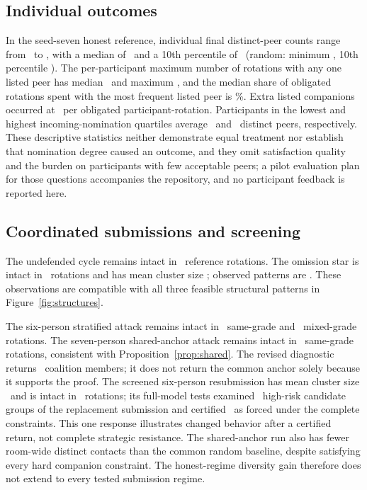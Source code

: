 \documentclass[11pt,a4paper]{article}
\theoremstyle{definition}\newtheorem{definition}[theorem]{Definition}
\theoremstyle{remark}\newtheorem{remark}[theorem]{Remark}
\begin{document}
\subsection{Individual outcomes}
In the seed-seven honest reference, individual final distinct-peer counts range from \FairMin\ to \FairMax, with a median of \PeersMedian\ and a 10th percentile of \PeersPTen\ (random: minimum \PeersMinRandom, 10th percentile \PeersPTenRandom). The per-participant maximum number of rotations with any one listed peer has median \RepeatSameMedian\ and maximum \RepeatSameMax, and the median share of obligated rotations spent with the most frequent listed peer is \ConcentrationMedian\%. Extra listed companions occurred at \ExtrasPerObligatedRotation\ per obligated participant-rotation. Participants in the lowest and highest incoming-nomination quartiles average \FairLowIn\ and \FairHighIn\ distinct peers, respectively. These descriptive statistics neither demonstrate equal treatment nor establish that nomination degree caused an outcome, and they omit satisfaction quality and the burden on participants with few acceptable peers; a pilot evaluation plan for those questions accompanies the repository, and no participant feedback is reported here.

\subsection{Coordinated submissions and screening}
The undefended cycle remains intact in \NoneIntact\ reference rotations. The omission star is intact in \StarIntact\ rotations and has mean cluster size \StarAvgCluster; observed patterns are \StarPatterns. These observations are compatible with all three feasible structural patterns in Figure~\ref{fig:structures}.

The six-person stratified attack remains intact in \StratIntactSame\ same-grade and \StratIntactMixed\ mixed-grade rotations. The seven-person shared-anchor attack remains intact in \SharedIntactSame\ same-grade rotations, consistent with Proposition~\ref{prop:shared}. The revised diagnostic returns \SharedReturned\ coalition members; it does not return the common anchor solely because it supports the proof. The screened six-person resubmission has mean cluster size \ScreenedAvgCluster\ and is intact in \ScreenedIntact\ rotations; its full-model tests examined \ScreenedFullModelExamined\ high-risk candidate groups of the replacement submission and certified \ScreenedFullModelForced\ as forced under the complete constraints. This one response illustrates changed behavior after a certified return, not complete strategic resistance. The shared-anchor run also has fewer room-wide distinct contacts than the common random baseline, despite satisfying every hard companion constraint. The honest-regime diversity gain therefore does not extend to every tested submission regime.

\end{document}
